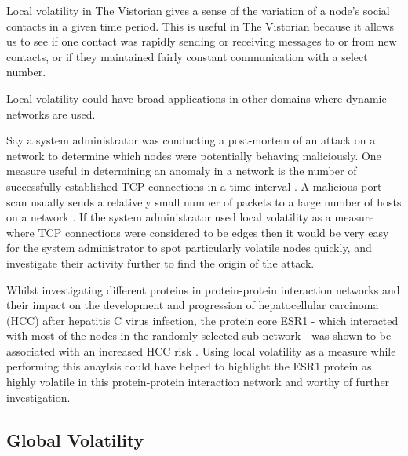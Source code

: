 Local volatility in The Vistorian gives a sense of the variation of a node's social contacts in a given time period. This is useful in The Vistorian because it allows us to see if one contact was rapidly sending or receiving messages to or from new contacts, or if they maintained fairly constant communication with a select number. 
\newline

Local volatility could have broad applications in other domains where dynamic networks are used. 

Say a system administrator was conducting a post-mortem of an attack on a network to determine which nodes were potentially behaving maliciously. One measure useful in determining an anomaly in a network is the number of successfully established TCP connections in a time interval \cite{fnpfid}. A malicious port scan usually sends a relatively small number of packets to a large number of hosts on a network \cite{fnpfid}. If the system administrator used local volatility as a measure where TCP connections were considered to be edges then it would be very easy for the system administrator to spot particularly volatile nodes quickly, and investigate their activity further to find the origin of the attack.


Whilst investigating different proteins in protein-protein interaction networks and their impact on the development and progression of hepatocellular carcinoma (HCC) after hepatitis C virus infection, the protein core ESR1 - which interacted with most of the nodes in the randomly selected sub-network - was shown to be associated with an increased HCC risk \cite{acaotdbnihih}. Using local volatility as a measure while performing this anaylsis could have helped to highlight the ESR1 protein as highly volatile in this protein-protein interaction network and worthy of further investigation.


\subsection{Global Volatility}

